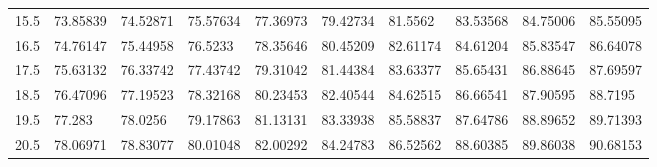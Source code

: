 \documentclass[10pt,twocolumn,letterpaper]{article}
\begin{document}
\begin{table}
\begin{tabular}{llllllllll}
    15.5            & 73.85839                               & 74.52871                               & 75.57634                                & 77.36973                                & 79.42734                                & 81.5562                                 & 83.53568                                & 84.75006                                & 85.55095                                \\
    16.5            & 74.76147                               & 75.44958                               & 76.5233                                 & 78.35646                                & 80.45209                                & 82.61174                                & 84.61204                                & 85.83547                                & 86.64078                                \\
    17.5            & 75.63132                               & 76.33742                               & 77.43742                                & 79.31042                                & 81.44384                                & 83.63377                                & 85.65431                                & 86.88645                                & 87.69597                                \\
    18.5            & 76.47096                               & 77.19523                               & 78.32168                                & 80.23453                                & 82.40544                                & 84.62515                                & 86.66541                                & 87.90595                                & 88.7195                                 \\
    19.5            & 77.283                                 & 78.0256                                & 79.17863                                & 81.13131                                & 83.33938                                & 85.58837                                & 87.64786                                & 88.89652                                & 89.71393                                \\
    20.5            & 78.06971                               & 78.83077                               & 80.01048                                & 82.00292                                & 84.24783                                & 86.52562                                & 88.60385                                & 89.86038                                & 90.68153                                \\

\end{tabular}
\end{table}
\end{document}
